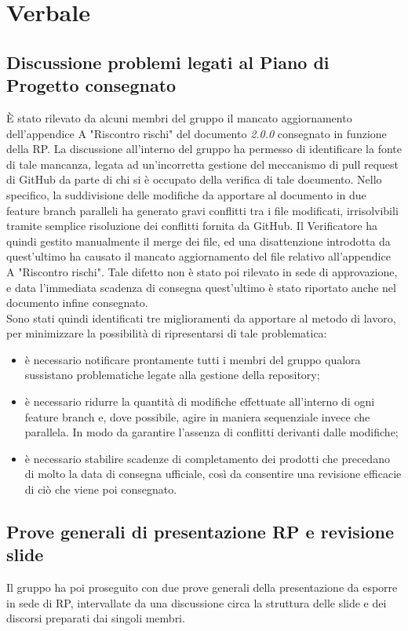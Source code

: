 \section{Verbale}

	\subsection{Discussione problemi legati al Piano di Progetto consegnato}
		È stato rilevato da alcuni membri del gruppo il mancato aggiornamento dell'appendice A "Riscontro rischi" del documento \PdP{} \textit{2.0.0} consegnato in funzione della RP.
		La discussione all'interno del gruppo ha permesso di identificare la fonte di tale mancanza, legata ad un'incorretta gestione del meccanismo di pull request di GitHub da parte di chi si è occupato della verifica di tale documento.
		Nello specifico, la suddivisione delle modifiche da apportare al documento in due feature branch paralleli ha generato gravi conflitti tra i file modificati, irrisolvibili tramite semplice risoluzione dei conflitti fornita da GitHub.
		Il Verificatore ha quindi gestito manualmente il merge dei file, ed una disattenzione introdotta da quest'ultimo ha causato il mancato aggiornamento del file relativo all'appendice A "Riscontro rischi". Tale difetto non è stato poi rilevato in sede di approvazione, e data l'immediata scadenza di consegna quest'ultimo è stato riportato anche nel documento infine consegnato. \\
		Sono stati quindi identificati tre miglioramenti da apportare al metodo di lavoro, per minimizzare la possibilità di ripresentarsi di tale problematica:
		\begin{itemize}
			\item è necessario notificare prontamente tutti i membri del gruppo qualora sussistano problematiche legate alla gestione della repository;
			\item è necessario ridurre la quantità di modifiche effettuate all'interno di ogni feature branch e, dove possibile, agire in maniera sequenziale invece che parallela. In modo da garantire l'assenza di conflitti derivanti dalle modifiche;
			\item è necessario stabilire scadenze di completamento dei prodotti che precedano di molto la data di consegna ufficiale, così da consentire una revisione efficacie di ciò che viene poi consegnato.
		\end{itemize}

	\subsection{Prove generali di presentazione RP e revisione slide}
		Il gruppo ha poi proseguito con due prove generali della presentazione da esporre in sede di RP, intervallate da una discussione circa la struttura delle slide e dei discorsi preparati dai singoli membri.
